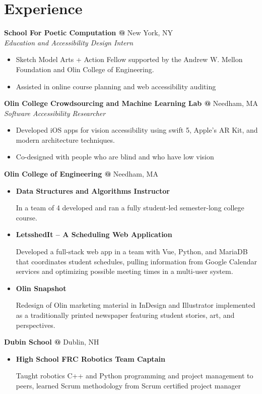 \documentclass[10pt]{article} %
\begin{document}
\begin{minipage}[t]{0.8\textwidth}
\section*{Experience}
\textbf{School For Poetic Computation @} \space New York, NY\\
\textit{Education and Accessibility Design Intern}\\
\begin{itemize} [noitemsep,topsep=0pt]
  \item Sketch Model Arts + Action Fellow supported by the Andrew W. Mellon Foundation and Olin College of Engineering.
  \item Assisted in online course planning and web accessibility auditing
    \\
\end{itemize}
\textbf{Olin College Crowdsourcing and Machine Learning Lab @} \space Needham, MA\\
\textit{Software Accessibility Researcher}\\
\begin{itemize} [noitemsep,topsep=0pt]
  \item Developed iOS apps for vision accessibility using swift 5, Apple’s AR Kit, and modern architecture techniques.
  \item Co-designed with people who are blind and who have low vision
  \\
\end{itemize}
\textbf{Olin College of Engineering @} \space Needham, MA\\
\begin{itemize} [noitemsep,topsep=0pt]
\item {}\textbf{Data Structures and Algorithms Instructor}
  
  In a team of 4 developed and ran a fully student-led semester-long college course.
\item {}\textbf{LetsshedIt – A Scheduling Web Application}

  Developed a full-stack web app in a team with Vue, Python, and MariaDB that coordinates student schedules, pulling information from Google Calendar services and optimizing possible meeting times in a multi-user system.
\item {}\textbf{Olin Snapshot }

   Redesign of Olin marketing material in InDesign and Illustrator implemented as a traditionally printed newspaper featuring student stories, art, and perspectives.
  \\
\end{itemize}
\textbf{Dubin School @} \space Dublin, NH\\
\begin{itemize} [noitemsep,topsep=0pt]
\item {}\textbf{High School FRC Robotics Team Captain}

  Taught robotics C++ and Python programming and project management to peers, learned Scrum methodology from Scrum certified project manager
  \\
\end{itemize}
\end{minipage}
\end{document}
